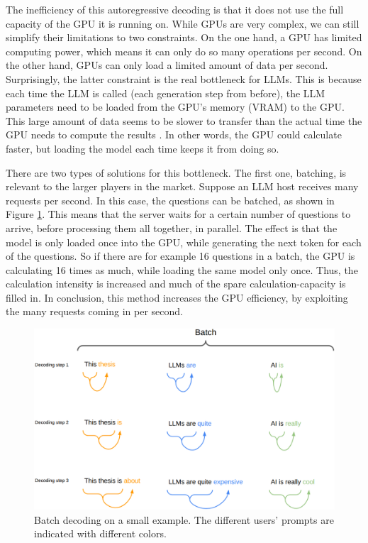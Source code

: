The inefficiency of this autoregressive decoding is that it does not use the full capacity of the GPU it is running on. While GPUs are very complex, we can still simplify their limitations to two constraints. On the one hand, a GPU has limited computing power, which means it can only do so many operations per second. On the other hand, GPUs can only load a limited amount of data per second. Surprisingly, the latter constraint is the real bottleneck for LLMs. This is because each time the LLM is called (each generation step from before), the LLM parameters need to be loaded from the GPU's memory (VRAM) to the GPU. This large amount of data seems to be slower to transfer than the actual time the GPU needs to compute the results \cite{gholami2024ai, kim2023full}. In other words, the GPU could calculate faster, but loading the model each time keeps it from doing so.

There are two types of solutions for this bottleneck. The first one, batching, is relevant to the larger players in the market. Suppose an LLM host receives many requests per second. In this case, the questions can be batched, as shown in Figure \ref{fig:spec_dec_batch}. This means that the server waits for a certain number of questions to arrive, before processing them all together, in parallel. The effect is that the model is only loaded once into the GPU, while generating the next token for each of the questions. So if there are for example 16 questions in a batch, the GPU is calculating 16 times as much, while loading the same model only once. Thus, the calculation intensity is increased and much of the spare calculation-capacity is filled in. In conclusion, this method increases the GPU efficiency, by exploiting the many requests coming in per second.

\begin{figure}[h]
	\centering
	\includegraphics[width=1\linewidth]{fig/spec_dec_batch.png}
	\caption{Batch decoding on a small example. The different users' prompts are indicated with different colors.}
	\label{fig:spec_dec_batch}
\end{figure}

